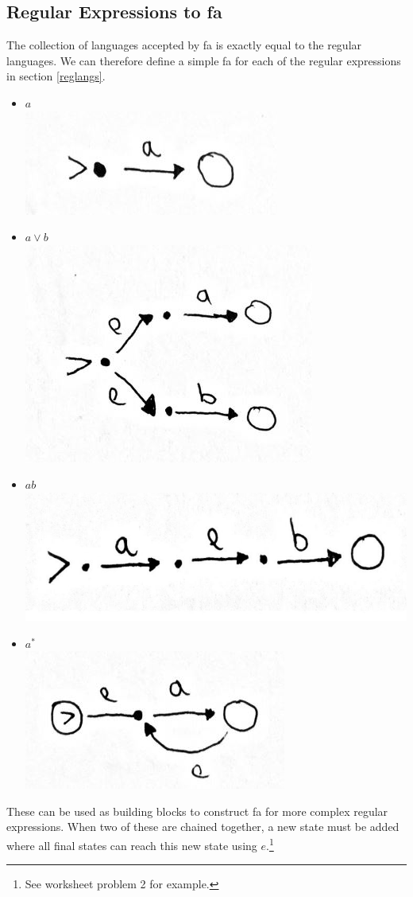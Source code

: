 \documentclass{article}
\begin{document}
		\subsection{Regular Expressions to fa}
			The collection of languages accepted by fa is exactly equal to the regular languages. We can therefore define a simple fa for each of the regular expressions in section \ref{reglangs}. \\
			\begin{itemize}
				\item $a$ \\ 
				\includegraphics[scale=0.5]{a}
				\item $a \lor b$ \\ 
				\includegraphics[scale=0.5]{aorb}
				\item $ab$ \\
				\includegraphics[scale=0.25]{ab}
				\item $a^*$ \\
				\includegraphics[scale=0.5]{astar}
			\end{itemize}
			These can be used as building blocks to construct fa for more complex regular expressions. When two of these are chained together, a new state must be added where all final states can reach this new state using $e$.\footnote{See worksheet problem 2 for example.}
\end{document}

